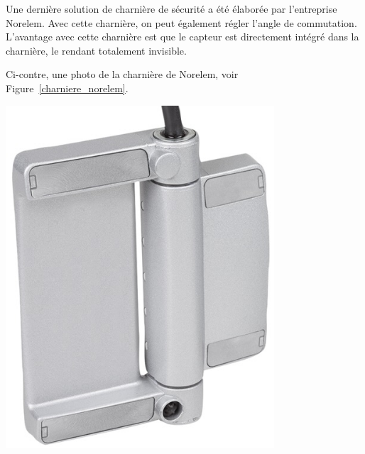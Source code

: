 \begin{minipage}[c]{0.6\textwidth}
    Une dernière solution de charnière de sécurité a été élaborée par l'entreprise Norelem. Avec cette charnière, on peut également régler l'angle de commutation. L'avantage avec cette charnière est que le capteur est directement intégré dans la charnière, le rendant totalement invisible.

    Ci-contre, une photo de la charnière de Norelem, voir Figure~\ref{charniere_norelem}.
\end{minipage}\hfill
\begin{minipage}[c]{0.35\textwidth}
    \begin{center}
        \includegraphics[width=0.75\textwidth]{assets/figures/Protections_laser/Securite_electrique/charniere_norelem.jpeg}
    \end{center}
    \label{charniere_norelem}
\end{minipage}

